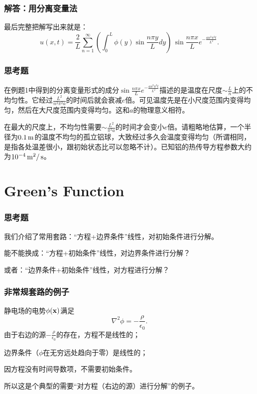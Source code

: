\documentclass[CJK]{beamer}
\begin{document}
\begin{frame}
  \frametitle{解答：用分离变量法}
  最后完整把解写出来就是：
  $$ u(x,t) = \frac{2}{L}\sum_{n=1}^\infty \left(\int_0^L \phi(y)\sin\frac{n\pi y}{L} dy \right)\, \sin\frac{n\pi x}{L}e^{-\frac{an^2\pi^2t}{L^2}} .$$

\end{frame}

\begin{frame}
  \frametitle{思考题}
  在例题1中得到的分离变量形式的成分$\sin\frac{n\pi x}{L}e^{-\frac{an^2\pi^2t}{L^2}}$描述的是温度在尺度$\sim \frac{L}{n}$上的不均匀性。它经过$\frac{L^2}{n^2\pi^2a}$的时间后就会衰减$e$倍。可见温度先是在小尺度范围内变得均匀，然后在大尺度范围内变得均匀。这和$a$的物理意义相符。

  \skipline

  在最大的尺度上，不均匀性需要$\sim \frac{L^2}{\pi^2a}$的时间才会变小$e$倍。请粗略地估算，一个半径为$0.1\,\mathrm{m}$的温度不均匀的孤立铝球，大致经过多久会温度变得均匀（所谓相同，是指各处温差很小，跟初始状态比可以忽略不计）。已知铝的热传导方程参数大约为$10^{-4}\,\mathrm{m}^2/\,\mathrm{s}$。
\end{frame}


\section{Green's Function}

\begin{frame}
  \frametitle{思考题}

  我们介绍了常用套路：{\blue “方程+边界条件”线性，对初始条件进行分解。}
  
  能不能换成：{\blue “方程+初始条件”线性，对边界条件进行分解？}

  或者：{\blue “边界条件+初始条件”线性，对方程进行分解？}
  
\end{frame}  


\begin{frame}
  \frametitle{非常规套路的例子}
  静电场的电势$\phi({\mathbf{x}})$满足
  $$\nabla^2\phi = -\frac{\rho}{\epsilon_0}.$$
  由于右边的源$-\frac{\rho}{\epsilon_0}$的存在，方程不是线性的；
  
  边界条件（$\phi$在无穷远处趋向于零）是线性的；

  因方程没有时间导数项，不需要初始条件。

  \skiplines
  
  所以这是个典型的需要“对方程（右边的源）进行分解”的例子。
\end{frame}  
\end{document}
